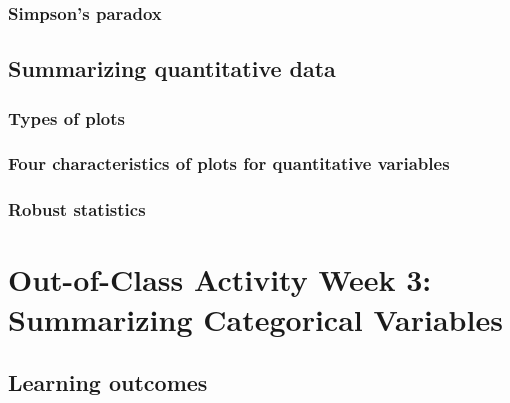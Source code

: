 \documentclass[
]{report}
\begin{document}
\hypertarget{simpsons-paradox}{%
\subsubsection*{Simpson's paradox}\label{simpsons-paradox}}

\hypertarget{summarizing-quantitative-data}{%
\subsection*{Summarizing quantitative data}\label{summarizing-quantitative-data}}

\hypertarget{types-of-plots}{%
\subsubsection*{Types of plots}\label{types-of-plots}}

\hypertarget{four-characteristics-of-plots-for-quantitative-variables}{%
\subsubsection*{Four characteristics of plots for quantitative variables}\label{four-characteristics-of-plots-for-quantitative-variables}}

\hypertarget{robust-statistics}{%
\subsubsection*{Robust statistics}\label{robust-statistics}}

\hypertarget{out-of-class-activity-week-3-summarizing-categorical-variables}{%
\section{Out-of-Class Activity Week 3: Summarizing Categorical Variables}\label{out-of-class-activity-week-3-summarizing-categorical-variables}}

\hypertarget{learning-outcomes-4}{%
\subsection{Learning outcomes}\label{learning-outcomes-4}}
\end{document}
